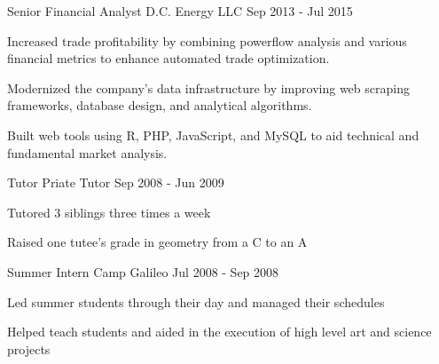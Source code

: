 \begin{cventries}
  \cventry
    {Senior Financial Analyst} %
    {D.C. Energy LLC} %
    {} %
    {Sep 2013 - Jul 2015} %
    {
      \begin{cvitems} %
        \item{Increased trade profitability by combining powerflow analysis and various financial metrics to enhance automated trade optimization.}
        \item {Modernized the company's data infrastructure by improving web scraping frameworks, database design, and analytical algorithms.}
        \item {Built web tools using R, PHP, JavaScript, and MySQL to aid technical and fundamental market analysis.}
      \end{cvitems}
    }
\ifoutdated
  \cventry
    {Tutor} %
    {Priate Tutor} %
    {} %
    {Sep 2008 - Jun 2009} %
    {
      \begin{cvitems} %
        \item Tutored 3 siblings three times a week
        \item	Raised one tutee's grade in geometry from a C to an A
      \end{cvitems}
    }
  \cventry
    {Summer Intern} %
    {Camp Galileo} %
    {} %
    {Jul 2008 - Sep 2008} %
    {
      \begin{cvitems} %
        \item Led summer students through their day and managed their schedules
        \item Helped teach students and aided in the execution of high level art and science projects
      \end{cvitems}
    }
\fi
\end{cventries}
